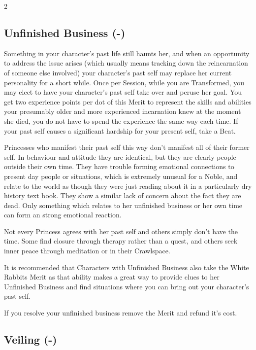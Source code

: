 \begin{multicols}{2}
\subsection*{Unfinished Business (\textbullet\nobreak\hspace{.16667em}-\nobreak\hspace{.16667em}\textbullet\textbullet\textbullet)}

Something in your character's past life still haunts her, and when an opportunity to address the issue arises (which usually means tracking down the reincarnation of someone else involved) your character's past self may replace her current personality for a short while. Once per Session, while you are Transformed, you may elect to have your character's past self take over and peruse her goal. You get two experience points per dot of this Merit to represent the skills and abilities your presumably older and more experienced incarnation knew at the moment she died, you do not have to spend the experience the same way each time. If your past self causes a significant hardship for your present self, take a Beat.

Princesses who manifest their past self this way don't manifest all of their former self. In behaviour and attitude they are identical, but they are clearly people outside their own time. They have trouble forming emotional connections to present day people or situations, which is extremely unusual for a Noble, and relate to the world as though they were just reading about it in a particularly dry history text book. They show a similar lack of concern about the fact they are dead. Only something which relates to her unfinished business or her own time can form an strong emotional reaction.

Not every Princess agrees with her past self and others simply don't have the time. Some find closure through therapy rather than a quest, and others seek inner peace through meditation or in their Crawlspace.

It is recommended that Characters with Unfinished Business also take the White Rabbits Merit as that ability makes a great way to provide clues to her Unfinished Business and find situations where you can bring out your character's past self.

If you resolve your unfinished business remove the Merit and refund it's cost. 

\subsection*{Veiling (\textbullet\nobreak\hspace{.16667em}-\nobreak\hspace{.16667em}\textbullet\textbullet\textbullet)}


\end{multicols}

